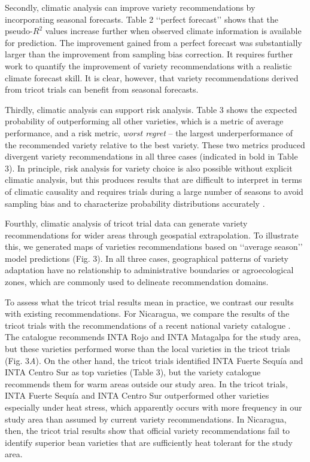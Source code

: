\documentclass[9pt,twocolumn,twoside]{pnas-new}
\begin{document}
Secondly, climatic analysis can improve variety recommendations by incorporating seasonal forecasts. Table 2 ‘‘perfect forecast’’ shows that the pseudo-$R^2$ values increase further when observed climate information is available for prediction. The improvement gained from a perfect forecast was substantially larger than the improvement from sampling bias correction. It requires further work to quantify the improvement of variety recommendations with a realistic climate forecast skill. It is clear, however, that variety recommendations derived from tricot trials can benefit from seasonal forecasts. 

Thirdly, climatic analysis can support risk analysis. Table 3 shows the expected probability of outperforming all other varieties, which is a metric of average performance, and a risk metric, \textit{worst regret} \cite{savage1951theory} -- the largest underperformance of the recommended variety relative to the best variety. These two metrics produced divergent variety recommendations in all three cases (indicated in bold in Table 3). In principle, risk analysis for variety choice is also possible without explicit climatic analysis, but this produces results that are difficult to interpret in terms of climatic causality and requires trials during a large number of seasons to avoid sampling bias and to characterize probability distributions accurately \cite{sukcharoen2016mean}.

Fourthly, climatic analysis of tricot trial data can generate variety recommendations for wider areas through geospatial extrapolation. To illustrate this, we generated maps of varieties recommendations based on ‘‘average season’’ model predictions (Fig. 3). In all three cases, geographical patterns of variety adaptation have no relationship to administrative boundaries or agroecological zones, which are commonly used to delineate recommendation domains. 

To assess what the tricot trial results mean in practice, we contrast our results with existing recommendations. For Nicaragua, we compare the results of the tricot trials with the recommendations of a recent national variety catalogue \cite{lopez2014catalogo}. The catalogue recommends INTA Rojo and INTA Matagalpa for the study area, but these varieties performed worse than the local varieties in the tricot trials (Fig. 3\textit{A}). On the other hand, the tricot trials identified INTA Fuerte Sequía and INTA Centro Sur as top varieties (Table 3), but the variety catalogue recommends them for warm areas outside our study area. In the tricot trials, INTA Fuerte Sequía and INTA Centro Sur outperformed  other varieties especially under heat stress, which apparently occurs with more frequency in our study area than assumed by current variety recommendations. In Nicaragua, then, the tricot trial results show that official variety recommendations fail to identify superior bean varieties that are sufficiently heat tolerant for the study area.
\end{document}
